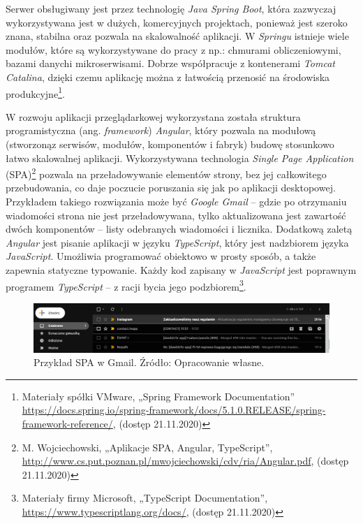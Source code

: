 \documentclass[twoside]{projektInzynierskiMS}
\numberwithin{figure}{section}
\begin{document}
Serwer obsługiwany jest przez technologię \textit{Java Spring Boot}, która zazwyczaj wykorzystywana jest w dużych, komercyjnych projektach, ponieważ jest szeroko znana, stabilna oraz pozwala na skalowalność aplikacji. W \textit{Springu} istnieje wiele modułów, które są wykorzystywane do pracy z np.: chmurami obliczeniowymi, bazami danych\linebreak i mikroserwisami. Dobrze współpracuje z kontenerami \textit{Tomcat Catalina}, dzięki czemu aplikację można z łatwością przenosić na środowiska produkcyjne\footnote{Materiały spółki VMware, „Spring Framework Documentation” \newline
\url{https://docs.spring.io/spring-framework/docs/5.1.0.RELEASE/spring-framework-reference/}, (dostęp 21.11.2020)}.

W rozwoju aplikacji przeglądarkowej wykorzystana została struktura programistyczna (ang. \textit{framework}) \textit{Angular}, który pozwala na modułową (stworzoną\linebreak z serwisów, modułów, komponentów i fabryk) budowę stosunkowo łatwo skalowalnej aplikacji. Wykorzystywana technologia \textit{Single Page Application} (SPA)\footnote{M. Wojciechowski, „Aplikacje SPA, Angular, TypeScript”,\newline
\url{http://www.cs.put.poznan.pl/mwojciechowski/cdv/ria/Angular.pdf}, (dostęp 21.11.2020)} pozwala na przeładowywanie elementów strony, bez jej całkowitego przebudowania, co daje poczucie poruszania się jak po aplikacji desktopowej. Przykładem takiego rozwiązania może być \textit{Google Gmail} – gdzie po otrzymaniu wiadomości strona nie jest przeładowywana, tylko aktualizowana jest zawartość dwóch komponentów – listy odebranych wiadomości i licznika.
Dodatkową zaletą \textit{Angular} jest pisanie aplikacji w języku \textit{TypeScript}, który jest nadzbiorem języka \textit{JavaScript}. Umożliwia programować obiektowo w prosty sposób, a także zapewnia statyczne typowanie. Każdy kod zapisany w \textit{JavaScript} jest poprawnym programem \textit{TypeScript} – z racji bycia jego podzbiorem\footnote{Materiały firmy Microsoft, „TypeScript Documentation”,\newline
\url{https://www.typescriptlang.org/docs/}, (dostęp 21.11.2020)}.

\begin{figure}[h!]
  \centering
  \includegraphics[width=\textwidth]{images/gmail_example.JPG}
    \caption{Przykład SPA w Gmail. Źródło: Opracowanie własne.}
    \label{fig:gmail_example}
\end{figure}
\end{document}
